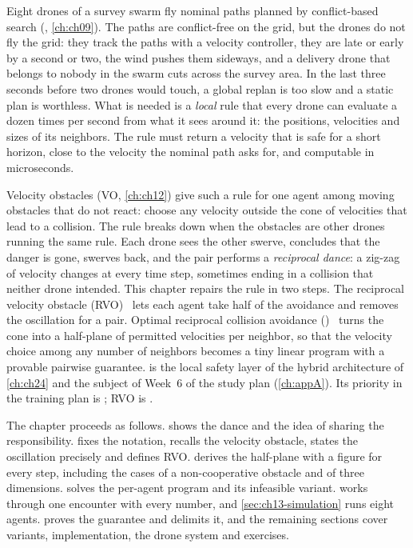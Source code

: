 Eight drones of a survey swarm fly nominal paths planned by conflict-based search (\cbs,
\cref{ch:ch09}). The paths are conflict-free on the grid, but the drones do
not fly the grid: they track the paths with a velocity controller, they are
late or early by a second or two, the wind pushes them sideways, and a
delivery drone that belongs to nobody in the swarm cuts across the survey
area. In the last three seconds before two drones would touch, a global
replan is too slow and a static plan is worthless. What is needed is a
\emph{local} rule that every drone can evaluate a dozen times per second from
what it sees around it: the positions, velocities and sizes of its
neighbors. The rule must return a velocity that is safe for a short horizon,
close to the velocity the nominal path asks for, and computable in
microseconds.

Velocity obstacles (VO, \cref{ch:ch12}) give such a rule for one agent among
moving obstacles that do not react: choose any velocity outside the cone of
velocities that lead to a collision. The rule breaks down when the obstacles
are other drones running the same rule. Each drone sees the other swerve,
concludes that the danger is gone, swerves back, and the pair performs a
\emph{reciprocal dance}: a zig-zag of velocity changes at every time step,
sometimes ending in a collision that neither drone intended. This chapter
repairs the rule in two steps. The reciprocal velocity obstacle
(RVO)~\cite{vandenberg2008rvo} lets each agent take half of the avoidance and
removes the oscillation for a pair. Optimal reciprocal collision avoidance
(\orca)~\cite{vandenberg2011orca} turns the cone into a half-plane of
permitted velocities per neighbor, so that the velocity choice among any
number of neighbors becomes a tiny linear program with a provable pairwise
guarantee. \orca is the local safety layer of the hybrid architecture of
\cref{ch:ch24} and the subject of Week~6 of the study plan (\cref{ch:appA}).
Its priority in the training plan is ; RVO is
.

The chapter proceeds as follows.  shows the dance
and the idea of sharing the responsibility.  fixes the
notation, recalls the velocity obstacle, states the oscillation precisely and
defines RVO.  derives the \orca half-plane with a figure
for every step, including the cases of a non-cooperative obstacle and of three
dimensions.  solves the per-agent program and its
infeasible variant.  works through one encounter with
every number, and \cref{sec:ch13-simulation} runs eight agents.
 proves the guarantee and delimits it, and the
remaining sections cover variants, implementation, the drone system and
exercises.

